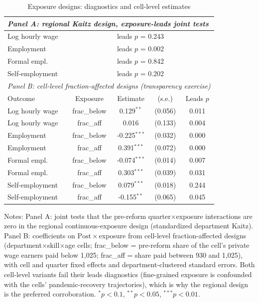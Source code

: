 \begin{table}[!tbp]\centering
\caption{Exposure designs: diagnostics and cell-level estimates}\label{tab:expocells}
\begin{threeparttable}
\footnotesize
\begin{tabular}{lcccc}
\toprule
\multicolumn{5}{l}{\emph{Panel A: regional Kaitz design, exposure-leads joint tests}}\\
\midrule
Log hourly wage & \multicolumn{4}{c}{leads $p$ = 0.243} \\
Employment & \multicolumn{4}{c}{leads $p$ = 0.002} \\
Formal empl. & \multicolumn{4}{c}{leads $p$ = 0.842} \\
Self-employment & \multicolumn{4}{c}{leads $p$ = 0.202} \\
\midrule
\multicolumn{5}{l}{\emph{Panel B: cell-level fraction-affected designs (transparency exercise)}}\\
Outcome & Exposure & Estimate & (s.e.) & Leads $p$ \\ \midrule
Log hourly wage & frac\_below & 0.129$^{**}$ & (0.056) & 0.011 \\
Log hourly wage & frac\_aff & 0.016 & (0.133) & 0.004 \\
Employment & frac\_below & -0.225$^{***}$ & (0.032) & 0.000 \\
Employment & frac\_aff & 0.391$^{***}$ & (0.072) & 0.000 \\
Formal empl. & frac\_below & -0.074$^{***}$ & (0.014) & 0.007 \\
Formal empl. & frac\_aff & 0.303$^{***}$ & (0.039) & 0.031 \\
Self-employment & frac\_below & 0.079$^{***}$ & (0.018) & 0.244 \\
Self-employment & frac\_aff & -0.155$^{**}$ & (0.065) & 0.045 \\
\bottomrule
\end{tabular}
\begin{tablenotes}\footnotesize
\item Notes: Panel A: joint tests that the pre-reform quarter$\times$exposure interactions are zero in the regional continuous-exposure design (standardized department Kaitz). Panel B: coefficients on $\mathrm{Post}\times$exposure from cell-level fraction-affected designs (department$\times$skill$\times$age cells; frac\_below = pre-reform share of the cell's private wage earners paid below 1{,}025; frac\_aff = share paid between 930 and 1{,}025), with cell and quarter fixed effects and department-clustered standard errors. Both cell-level variants fail their leads diagnostics (fine-grained exposure is confounded with the cells' pandemic-recovery trajectories), which is why the regional design is the preferred corroboration. $^{*}p<0.1$, $^{**}p<0.05$, $^{***}p<0.01$.
\end{tablenotes}
\end{threeparttable}\end{table}
